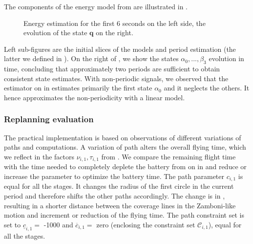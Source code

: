 The components of the energy model from  are illustrated in . 
\begin{figure}[h!]
  \centering
  \selectfont
  \footnotesize    
  
  \caption[Energy estimation and evolution of the state]{Energy estimation for the first 6 seconds on the left side, the evolution of the state $\mathbf{q}$ on the right.}
  \label{fig:evols-revised}
\end{figure}
Left sub-figures are the initial slices of the models and period estimation (the latter we defined in ). On the right of , we show the states $\alpha_0,...,\beta_3$ evolution in time, concluding that approximately two periods are sufficient to obtain consistent state estimates. With non-periodic signals, we observed that the estimator on  in  estimates primarily the first state $\alpha_0$ and it neglects the others. It hence approximates the non-periodicity with a linear model.

\subsubsection*{Replanning evaluation}

The practical implementation is based on observations of different variations of paths and computations. A variation of path alters the overall flying time, which we reflect in the factors $\nu_{i,1},\tau_{i,1}$ from . We compare the remaining flight time with the time needed to completely deplete the battery from  on  in  and reduce or increase the parameter to optimize the battery time. The path parameter $c_{i,1}$ is equal for all the stages. It changes the radius of the first circle in the current period and therefore shifts the other paths accordingly. The change is in , resulting in a shorter distance between the coverage lines in the Zamboni-like motion and increment or reduction of the flying time. The path constraint set is set to $\underline{c}_{i,1}=$ -1000 and $\overline{c}_{i,1}=$ zero (enclosing the constraint set $\mathcal{C}_{i,1}$), equal for all the stages.

